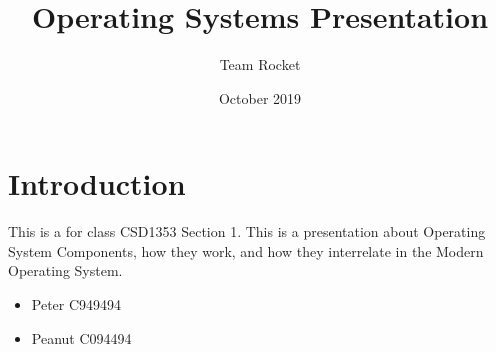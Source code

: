 \documentclass{article}
\title{Operating Systems Presentation}
\author{Team Rocket}
\date{October 2019}
\begin{document}
\maketitle
\tableofcontents

\section{Introduction}
This is a for class CSD1353 Section 1.
This is a presentation about Operating System Components, how they work, and how they interrelate in the Modern Operating System.

\begin{itemize}
    \item Peter C949494
    \item Peanut C094494
\end{itemize}
    
    
\end{document}
